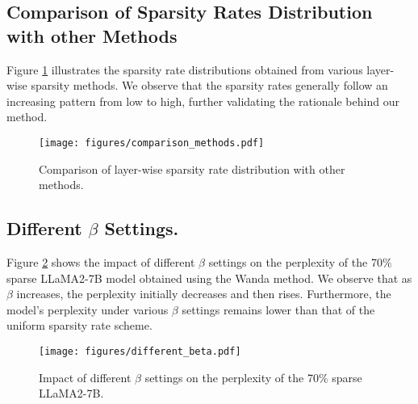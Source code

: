 \subsection{Comparison of Sparsity Rates Distribution with other Methods}\label{ComparisonDistribution}
Figure \ref{fig:comparison_methods} illustrates the sparsity rate distributions obtained from various layer-wise sparsity methods. We observe that the sparsity rates generally follow an increasing pattern from low to high, further validating the rationale behind our method.
\begin{figure}[h]
    \centering
    \texttt{[image: figures/comparison\_methods.pdf]}
    \caption{Comparison of layer-wise sparsity rate distribution with other methods.}
    \label{fig:comparison_methods}
\end{figure}

\subsection{Different $\beta$ Settings.}\label{sec:Different_beta}
Figure \ref{fig:different_beta} shows the impact of different \(\beta\) settings on the perplexity of the 70$\%$ sparse LLaMA2-7B model obtained using the Wanda method. We observe that as \(\beta\) increases, the perplexity initially decreases and then rises. Furthermore, the model's perplexity under various \(\beta\) settings remains lower than that of the uniform sparsity rate scheme.
\begin{figure}[h]
    \centering
    \texttt{[image: figures/different\_beta.pdf]}
    \caption{Impact of different \(\beta\) settings on the perplexity of the 70$\%$ sparse LLaMA2-7B.}
    \label{fig:different_beta}
\end{figure}


